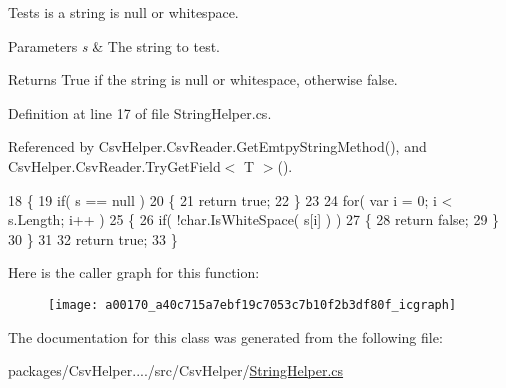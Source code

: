 Tests is a string is null or whitespace. 


\begin{DoxyParams}{Parameters}
{\em s} & The string to test.\\
\hline
\end{DoxyParams}
\begin{DoxyReturn}{Returns}
True if the string is null or whitespace, otherwise false.
\end{DoxyReturn}


Definition at line 17 of file String\-Helper.\-cs.



Referenced by Csv\-Helper.\-Csv\-Reader.\-Get\-Emtpy\-String\-Method(), and Csv\-Helper.\-Csv\-Reader.\-Try\-Get\-Field$<$ T $>$().


\begin{DoxyCode}
18         \{
19             \textcolor{keywordflow}{if}( s == null )
20             \{
21                 \textcolor{keywordflow}{return} \textcolor{keyword}{true};
22             \}
23 
24             \textcolor{keywordflow}{for}( var i = 0; i < s.Length; i++ )
25             \{
26                 \textcolor{keywordflow}{if}( !\textcolor{keywordtype}{char}.IsWhiteSpace( s[i] ) )
27                 \{
28                     \textcolor{keywordflow}{return} \textcolor{keyword}{false};
29                 \}
30             \}
31 
32             \textcolor{keywordflow}{return} \textcolor{keyword}{true};
33         \}
\end{DoxyCode}


Here is the caller graph for this function\-:
\nopagebreak
\begin{figure}[H]
\begin{center}
\leavevmode
\texttt{[image: a00170\_a40c715a7ebf19c7053c7b10f2b3df80f\_icgraph]}
\end{center}
\end{figure}




The documentation for this class was generated from the following file\-:\begin{DoxyCompactItemize}
\item 
packages/\-Csv\-Helper..../src/\-Csv\-Helper/\hyperlink{a00262}{String\-Helper.\-cs}\end{DoxyCompactItemize}

